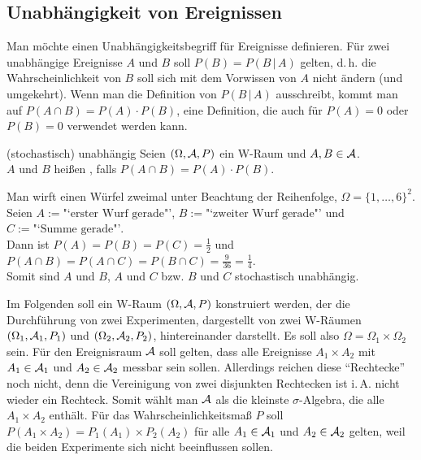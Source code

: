 \subsection{%
    Unabhängigkeit von Ereignissen%
}

\begin{Bem}
    Man möchte einen Unabhängigkeitsbegriff für Ereignisse definieren.
    Für zwei unabhängige Ereignisse $A$ und $B$ soll $P(B) = P(B \,|\, A)$ gelten,
    d.\,h. die Wahrscheinlichkeit von $B$ soll sich mit dem Vorwissen von $A$ nicht ändern
    (und umgekehrt).
    Wenn man die Definition von $P(B \,|\, A)$ ausschreibt, kommt man auf
    $P(A \cap B) = P(A) \cdot P(B)$, eine Definition, die auch für $P(A) = 0$ oder $P(B) = 0$
    verwendet werden kann.
\end{Bem}

\begin{Def}{(stochastisch) unabhängig}
    Seien $(\Omega, \mathcal{A}, P)$ ein W-Raum und $A, B \in \mathcal{A}$.\\
    $A$ und $B$ heißen , falls $P(A \cap B) = P(A) \cdot P(B)$.
\end{Def}

\begin{Bsp}
    Man wirft einen Würfel zweimal unter Beachtung der Reihenfolge,
    $\Omega = \{1, \dotsc, 6\}^2$.
    Seien $A := \text{"`erster Wurf gerade"'}$, $B := \text{"`zweiter Wurf gerade"'}$ und
    $C := \text{"`Summe gerade"'}$.\\
    Dann ist $P(A) = P(B) = P(C) = \frac{1}{2}$ und
    $P(A \cap B) = P(A \cap C) = P(B \cap C) = \frac{9}{36} = \frac{1}{4}$.\\
    Somit sind $A$ und $B$, $A$ und $C$ bzw. $B$ und $C$ stochastisch unabhängig.
\end{Bsp}

\linie
\pagebreak

\begin{Bem}
    Im Folgenden soll ein W-Raum $(\Omega, \mathcal{A}, P)$ konstruiert werden,
    der die Durchführung von zwei Experimenten, dargestellt von zwei W-Räumen
    $(\Omega_1, \mathcal{A}_1, P_1)$ und $(\Omega_2, \mathcal{A}_2, P_2)$, hintereinander darstellt.
    Es soll also $\Omega = \Omega_1 \times \Omega_2$ sein.
    Für den Ereignisraum $\mathcal{A}$ soll gelten, dass alle Ereignisse $A_1 \times A_2$ mit
    $A_1 \in \mathcal{A}_1$ und $A_2 \in \mathcal{A}_2$ messbar sein sollen.
    Allerdings reichen diese "`Rechtecke"' noch nicht, denn die Vereinigung von zwei disjunkten
    Rechtecken ist i.\,A. nicht wieder ein Rechteck.
    Somit wählt man $\mathcal{A}$ als die kleinste $\sigma$-Algebra, die alle $A_1 \times A_2$ enthält.
    Für das Wahrscheinlichkeitsmaß $P$ soll $P(A_1 \times A_2) = P_1(A_1) \times P_2(A_2)$ für alle
    $A_1 \in \mathcal{A}_1$ und $A_2 \in \mathcal{A}_2$ gelten, weil die beiden Experimente sich nicht
    beeinflussen sollen.
\end{Bem}

